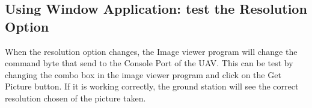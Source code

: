 \subsection{Using Window Application: test the Resolution Option}

When the resolution option changes, the Image viewer program will change the command byte that send to the Console Port of the UAV. 
This can be test by changing the combo box in the image viewer program and click on the Get Picture button.
If it is working correctly, the ground station will see the correct resolution chosen of the picture taken.




